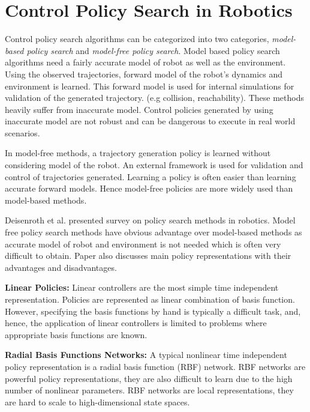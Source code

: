 \section{Control Policy Search in Robotics}

Control policy search algorithms can be categorized into two categories, \textit{model-based policy search} and \textit{model-free policy search}. Model based policy search algorithms need a fairly accurate model of robot as well as the environment. Using the observed trajectories, forward model of the robot's dynamics and environment is learned. This forward model is used for internal simulations for validation of the generated trajectory. (e.g collision, reachability). These methods heavily suffer from inaccurate model. Control policies generated by using inaccurate model are not robust and can be dangerous to execute in real world scenarios.  

In model-free methods, a trajectory generation policy is learned without considering model of the robot. An external framework is used for validation and control of trajectories generated. Learning a policy is often easier than learning accurate forward models. Hence model-free policies are more widely used than model-based methods\cite{deisenroth2013survey}. 

Deisenroth et al.\cite{deisenroth2013survey} presented survey on policy search methods in robotics. Model free policy search methods have obvious advantage over model-based methods as accurate model of robot and environment is not needed which is often very difficult to obtain. Paper also discusses main policy representations with their advantages and disadvantages.  

\textbf{Linear Policies:} Linear controllers are the most simple time independent representation. Policies are represented as linear combination of basis function. However, specifying the basis functions by hand is typically a difficult task, and, hence, the application of linear controllers is limited to problems where appropriate basis functions are known\cite{deisenroth2013survey}.

\textbf{Radial Basis Functions Networks:} A typical nonlinear time independent policy representation is a radial basis function (RBF) network. RBF networks are powerful policy representations, they are also difficult to learn due to the high number of nonlinear parameters. RBF networks are local representations, they are hard to scale to high-dimensional state spaces\cite{deisenroth2013survey}.


